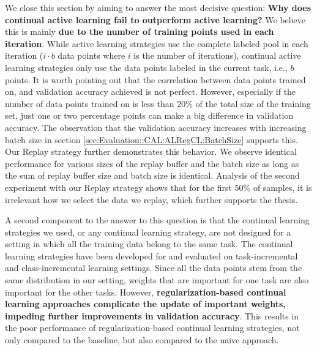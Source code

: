 We close this section by aiming to answer the most decisive question: \textbf{Why does continual active learning fail to outperform active learning?} We believe this is mainly
\textbf{due to the number of training points used in each iteration}. While active learning strategies use the complete labeled pool in each iteration ($i \cdot b$ data
points where $i$ is the number of iterations), continual active learning strategies only use the data points labeled in the current task, i.e., $b$ points.
It is worth pointing out that the correlation between data points trained on, and validation accuracy achieved is not perfect. However, especially if the
number of data points trained on is less than 20\% of the total size of the training set, just one or two percentage points can make a big difference in validation
accuracy. The observation that the validation accuracy increases with increasing batch size in section \ref{sec:Evaluation::CAL:ALRegCL:BatchSize} supports this.
Our Replay strategy further demonstrates this behavior. We observe identical performance for various sizes of the replay buffer and the batch size as long as the sum
of replay buffer size and batch size is identical. Analysis of the second experiment with our Replay strategy shows that for the first 50\% of samples, it is irrelevant
how we select the data we replay, which further supports the thesis. \par
A second component to the answer to this question is that the continual learning strategies we used, or any continual learning strategy, are not
designed for a setting in which all the training data belong to the same task. The continual learning strategies have been developed for and evaluated on task-incremental
and class-incremental learning settings. Since all the data points stem from the same distribution in our setting, weights that are important for one task are also
important for the other tasks. However,  \textbf{regularization-based continual learning approaches complicate the update of important weights, impeding further improvements
in validation accuracy}. This results in the poor performance of regularization-based continual learning strategies, not only compared to the baseline, but also compared
to the naive approach.


